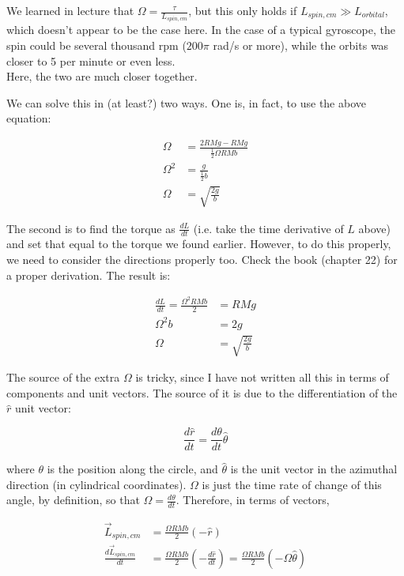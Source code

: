 \documentclass[8.01x]{subfiles}
\begin{document}
We learned in lecture that $\displaystyle \Omega = \frac{\tau}{L_{spin,cm}}$, but this only holds if $L_{spin,cm} \gg L_{orbital}$, which doesn't appear to be the case here. In the case of a typical gyroscope, the spin could be several thousand rpm ($200 \pi$ rad/s or more), while the orbits was closer to 5 per minute or even less.\\
Here, the two are much closer together.

We can solve this in (at least?) two ways. One is, in fact, to use the above equation:

\begin{align}
\Omega &= \frac{2 R M g - R M g}{\frac{1}{2} \Omega R M b}\\
\Omega^2 &= \frac{g}{\frac{1}{2} b}\\
\Omega &= \sqrt{\frac{2 g}{b}}
\end{align}

The second is to find the torque as $\displaystyle \frac{dL}{dt}$ (i.e. take the time derivative of $L$ above) and set that equal to the torque we found earlier. However, to do this properly, we need to consider the directions properly too. Check the book (chapter 22) for a proper derivation. The result is:

\begin{align}
\frac{dL}{dt} = \frac{\Omega^2 R M b}{2} &= R M g\\
                \Omega^2 b &= 2 g\\
                \Omega &= \sqrt{\frac{2 g}{b}}
\end{align}

The source of the extra $\Omega$ is tricky, since I have not written all this in terms of components and unit vectors. The source of it is due to the differentiation of the $\hat{r}$ unit vector:

\begin{equation}
\frac{d\hat{r}}{dt} = \frac{d\theta}{dt} \hat{\theta}
\end{equation}

where $\theta$ is the position along the circle, and $\hat{\theta}$ is the unit vector in the azimuthal direction (in cylindrical coordinates). $\Omega$ is just the time rate of change of this angle, by definition, so that $\displaystyle \Omega = \frac{d\theta}{dt}$. Therefore, in terms of vectors,

\begin{align}
\vec{L}_{spin,cm}             &= \frac{\Omega R M b}{2}(-\hat{r})\\
\frac{d\vec{L}_{spin,cm}}{dt} &= \frac{\Omega R M b}{2} \left(-\frac{d\hat{r}}{dt}\right) = \frac{\Omega R M b}{2} \left(-\Omega \hat{\theta}\right)
\end{align}
\end{document}
